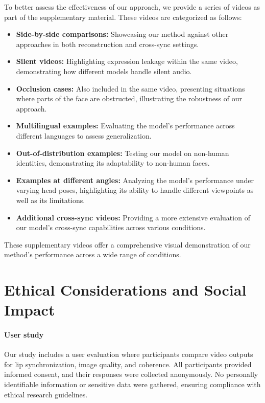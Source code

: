 To better assess the effectiveness of our approach, we provide a series of videos as part of the supplementary material. These videos are categorized as follows:
\begin{itemize}
\item \textbf{Side-by-side comparisons:} Showcasing our method against other approaches in both reconstruction and cross-sync settings.
\item \textbf{Silent videos:} Highlighting expression leakage within the same video, demonstrating how different models handle silent audio.
\item \textbf{Occlusion cases:} Also included in the same video, presenting situations where parts of the face are obstructed, illustrating the robustness of our approach.
\item \textbf{Multilingual examples:} Evaluating the model’s performance across different languages to assess generalization.
\item \textbf{Out-of-distribution examples:} Testing our model on non-human identities, demonstrating its adaptability to non-human faces.
\item  \textbf{Examples at different angles:} Analyzing the model’s performance under varying head poses, highlighting its ability to handle different viewpoints as well as its limitations.
\item \textbf{Additional cross-sync videos:} Providing a more extensive evaluation of our model’s cross-sync capabilities across various conditions.
\end{itemize}

These supplementary videos offer a comprehensive visual demonstration of our method’s performance across a wide range of conditions.


\section{Ethical Considerations and Social Impact}

\paragraph{User study}
Our study includes a user evaluation where participants compare video outputs for lip synchronization, image quality, and coherence. All participants provided informed consent, and their responses were collected anonymously. No personally identifiable information or sensitive data were gathered, ensuring compliance with ethical research guidelines.

